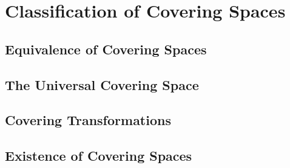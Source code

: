 \chapter{Classification of Covering Spaces}

\section{Equivalence of Covering Spaces}

\section{The Universal Covering Space}

\section{Covering Transformations}

\section{Existence of Covering Spaces}
